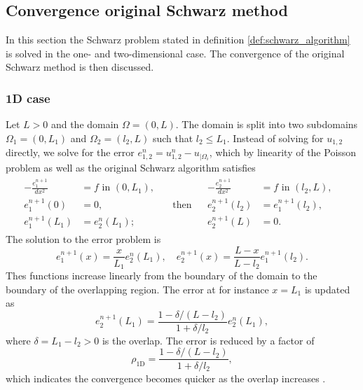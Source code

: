 \subsection{Convergence original Schwarz method} \label{sec:schwarz_convergence}
In this section the Schwarz problem stated in definition \ref{def:schwarz_algorithm} is solved in the one- and two-dimensional case. The convergence of the original Schwarz method is then discussed.

\subsubsection{1D case}
Let $L>0$ and the domain $\Omega = (0,L)$. The domain is split into two subdomains $\Omega_1 = (0,L_1)$ and $\Omega_2 = (l_2,L)$ such that $l_2\leq L_1$. Instead of solving for $u_{1,2}$ directly, we solve for the error $e^n_{1,2} = u^{n}_{1,2} - u_{|\Omega_i}$, which by linearity of the Poisson problem as well as the original Schwarz algorithm satisfies
\[
    \begin{array}{cc}
        \begin{aligned}
            -\frac{e_1^{n+1}}{d x^2} & = f           \text { in } (0,L_1), &                   \\
            e_1^{n+1}(0)             & = 0,                                & \quad \text{then} \\
            e_1^{n+1}(L_1)           & = e_2^n(L_1);                       &
        \end{aligned} &
        \begin{aligned}
            -\frac{e_2^{n+1}}{d x^2} & = f                \text { in } (l_2, L), & \\
            e_2^{n+1}(l_2)           & = e_1^{n+1}(l_2),                         & \\
            e_2^{n+1}(L)             & = 0.                                      &
        \end{aligned}
    \end{array}
\]
The solution to the error problem is
\[
    e_1^{n+1}(x) = \frac{x}{L_1}e_2^n(L_1), \quad e_2^{n+1}(x) = \frac{L-x}{L - l_2}e_1^{n+1}(l_2).
\]
Thes functions increase linearly from the boundary of the domain to the boundary of the overlapping region. The error at for instance $x = L_1$ is updated as
\[
    e_2^{n+1}(L_1) = \frac{1 - \delta/(L-l_2)}{1 + \delta/l_2} e_2^n(L_1),
\]
where $\delta = L_1 - l_2 > 0 $ is the overlap. The error is reduced by a factor of
\begin{equation}
    \rho_{\text{1D}} = \frac{1 - \delta/(L-l_2)}{1 + \delta/l_2},
    \label{eq:1D_Schwarz_convergence}
\end{equation}
which indicates the convergence becomes quicker as the overlap increases \cite[Section 1.5.1]{schwarz_methods_Dolean_2015}.

